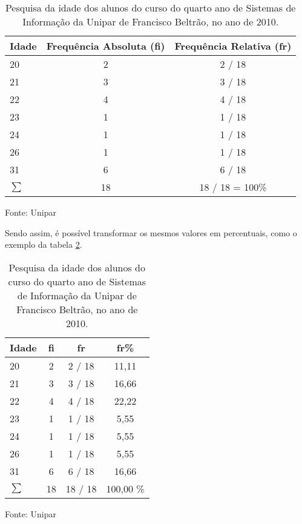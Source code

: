 \documentclass[espaco=simples,appendix=Name]{abnt}
\newcommand{\code}[1] {\textbf{#1}}
\begin{document}
\begin{table}
\caption{Pesquisa da idade dos alunos do curso do quarto ano de Sistemas de Informação da Unipar de Francisco Beltrão, no ano de 2010.}
\label{tabela FR}
\begin{tabular}{|l|c|c|} 
\hline 
Idade & Frequência Absoluta (\code{fi}) & Frequência Relativa (\code{fr}) \\ \hline 
20    &               2                   &              2 / 18 \\ 
21    &               3                   &              3 / 18 \\
22    &               4                   &              4 / 18 \\
23    &               1                   &              1 / 18 \\
24    &               1                   &              1 / 18 \\
26    &               1                   &              1 / 18 \\
31    &               6                   &              6 / 18 \\ 
\hline 
\begin{math}
\sum 
\end{math} & 18 & 18 / 18 = 100\% \\
\hline 
\end{tabular}
\small{Fonte: Unipar}
\end{table}

Sendo assim, é possível transformar os mesmos valores em percentuais, como o exemplo da tabela \ref{tabela FR percentual}.

\begin{table}
\caption{Pesquisa da idade dos alunos do curso do quarto ano de Sistemas de Informação da Unipar de Francisco Beltrão, no ano de 2010.}
\label{tabela FR percentual}
\begin{tabular}{|l|c|c|c|} 
\hline 

Idade &  \code{fi} & \code{fr}  & \code{fr\%} \\ \hline 
20    &      2       &      2 / 18  &   11,11  \\ 
21    &      3       &      3 / 18  &   16,66  \\
22    &      4       &      4 / 18  &   22,22  \\
23    &      1       &      1 / 18  &    5,55  \\
24    &      1       &      1 / 18  &    5,55  \\
26    &      1       &      1 / 18  &    5,55  \\
31    &      6       &      6 / 18  &   16,66  \\ 
\hline 
\begin{math}
\sum 
\end{math} & 18      &     18 / 18  & 100,00 \% \\
\hline 
\end{tabular}
\small{Fonte: Unipar}
\end{table}
\end{document}
